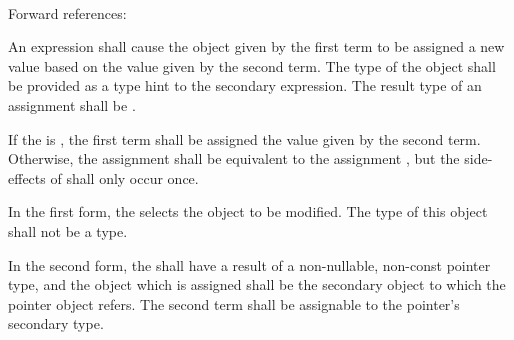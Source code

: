 \begin{grammar}
 \\
	   \\
	\terminal{*}    \\
	 \terminal{=}  \\
	\terminal{(}  \terminal{)} \terminal{=}  \\

 \oneof \\
	\terminal{=}
	\terminal{+=}
	\terminal{-=}
	\terminal{*=}
	\terminal{/=}
	\terminal{\%=}
	\terminal{\textless{}\textless{}=}
	\terminal{\textgreater{}\textgreater{}=}
	\terminal{\&=}
	\terminal{|=}
	\terminal{\textasciicircum=}
	\terminal{\&\&=}
	\terminal{||=}
	\terminal{\textasciicircum\textasciicircum=}
\end{grammar}

Forward references: 

\specsubsubitem
An  expression shall cause the object given by the
first term to be assigned a new value based on the value given by the second
term. The type of the object shall be provided as a type hint to the secondary
expression. The result type of an assignment shall be .

\specsubsubitem
If the  is \terminal{=}, the first term shall be
assigned the value given by the second term. Otherwise, the assignment
 shall be
equivalent to the assignment
,
but the side-effects of  shall only occur once.

\specsubsubitem
In the first form, the  selects the object to be
modified. The type of this object shall not be a  type.

\specsubsubitem
In the second form, the  shall have a result
of a non-nullable, non-const pointer type, and the object which is assigned
shall be the secondary object to which the pointer object refers. The second
term shall be assignable to the pointer's secondary type.

